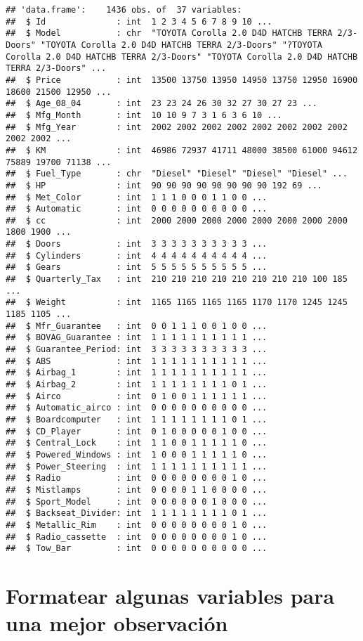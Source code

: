 \documentclass[
]{article}
\begin{document}
\begin{verbatim}
## 'data.frame':    1436 obs. of  37 variables:
##  $ Id              : int  1 2 3 4 5 6 7 8 9 10 ...
##  $ Model           : chr  "TOYOTA Corolla 2.0 D4D HATCHB TERRA 2/3-Doors" "TOYOTA Corolla 2.0 D4D HATCHB TERRA 2/3-Doors" "?TOYOTA Corolla 2.0 D4D HATCHB TERRA 2/3-Doors" "TOYOTA Corolla 2.0 D4D HATCHB TERRA 2/3-Doors" ...
##  $ Price           : int  13500 13750 13950 14950 13750 12950 16900 18600 21500 12950 ...
##  $ Age_08_04       : int  23 23 24 26 30 32 27 30 27 23 ...
##  $ Mfg_Month       : int  10 10 9 7 3 1 6 3 6 10 ...
##  $ Mfg_Year        : int  2002 2002 2002 2002 2002 2002 2002 2002 2002 2002 ...
##  $ KM              : int  46986 72937 41711 48000 38500 61000 94612 75889 19700 71138 ...
##  $ Fuel_Type       : chr  "Diesel" "Diesel" "Diesel" "Diesel" ...
##  $ HP              : int  90 90 90 90 90 90 90 90 192 69 ...
##  $ Met_Color       : int  1 1 1 0 0 0 1 1 0 0 ...
##  $ Automatic       : int  0 0 0 0 0 0 0 0 0 0 ...
##  $ cc              : int  2000 2000 2000 2000 2000 2000 2000 2000 1800 1900 ...
##  $ Doors           : int  3 3 3 3 3 3 3 3 3 3 ...
##  $ Cylinders       : int  4 4 4 4 4 4 4 4 4 4 ...
##  $ Gears           : int  5 5 5 5 5 5 5 5 5 5 ...
##  $ Quarterly_Tax   : int  210 210 210 210 210 210 210 210 100 185 ...
##  $ Weight          : int  1165 1165 1165 1165 1170 1170 1245 1245 1185 1105 ...
##  $ Mfr_Guarantee   : int  0 0 1 1 1 0 0 1 0 0 ...
##  $ BOVAG_Guarantee : int  1 1 1 1 1 1 1 1 1 1 ...
##  $ Guarantee_Period: int  3 3 3 3 3 3 3 3 3 3 ...
##  $ ABS             : int  1 1 1 1 1 1 1 1 1 1 ...
##  $ Airbag_1        : int  1 1 1 1 1 1 1 1 1 1 ...
##  $ Airbag_2        : int  1 1 1 1 1 1 1 1 0 1 ...
##  $ Airco           : int  0 1 0 0 1 1 1 1 1 1 ...
##  $ Automatic_airco : int  0 0 0 0 0 0 0 0 0 0 ...
##  $ Boardcomputer   : int  1 1 1 1 1 1 1 1 0 1 ...
##  $ CD_Player       : int  0 1 0 0 0 0 0 1 0 0 ...
##  $ Central_Lock    : int  1 1 0 0 1 1 1 1 1 0 ...
##  $ Powered_Windows : int  1 0 0 0 1 1 1 1 1 0 ...
##  $ Power_Steering  : int  1 1 1 1 1 1 1 1 1 1 ...
##  $ Radio           : int  0 0 0 0 0 0 0 0 1 0 ...
##  $ Mistlamps       : int  0 0 0 0 1 1 0 0 0 0 ...
##  $ Sport_Model     : int  0 0 0 0 0 0 1 0 0 0 ...
##  $ Backseat_Divider: int  1 1 1 1 1 1 1 1 0 1 ...
##  $ Metallic_Rim    : int  0 0 0 0 0 0 0 0 1 0 ...
##  $ Radio_cassette  : int  0 0 0 0 0 0 0 0 1 0 ...
##  $ Tow_Bar         : int  0 0 0 0 0 0 0 0 0 0 ...
\end{verbatim}

\hypertarget{formatear-algunas-variables-para-una-mejor-observaciuxf3n}{%
\section{Formatear algunas variables para una mejor
observación}\label{formatear-algunas-variables-para-una-mejor-observaciuxf3n}}
\end{document}
